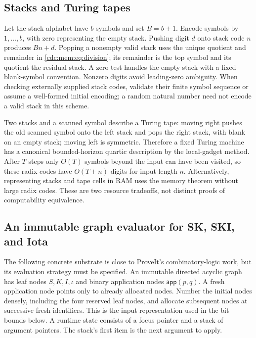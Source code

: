 \documentclass[11pt,a4paper]{article}
\theoremstyle{definition}
\theoremstyle{remark}
\newcommand{\app}{\mathsf{app}}
\begin{document}
\subsection{Stacks and Turing tapes}
Let the stack alphabet have $b$ symbols and set $B=b+1$. Encode symbols by
$1,\ldots,b$, with zero representing the empty stack. Pushing digit $d$ onto
stack code $n$ produces $Bn+d$. Popping a nonempty valid stack uses the unique
quotient and remainder in \eqref{cdc:mem:eq:division}; its remainder is the top symbol
and its quotient the residual stack. A zero test handles the empty stack with
a fixed blank-symbol convention. Nonzero digits avoid leading-zero ambiguity.
When checking externally supplied stack codes, validate their finite symbol
sequence or assume a well-formed initial encoding; a random natural number need
not encode a valid stack in this scheme.

Two stacks and a scanned symbol describe a Turing tape: moving right pushes the
old scanned symbol onto the left stack and pops the right stack, with blank on
an empty stack; moving left is symmetric. Therefore a fixed Turing machine has
a canonical bounded-horizon quartic description by the local-gadget method.
After $T$ steps only $O(T)$ symbols beyond the input can have been visited, so
these radix codes have $O(T+n)$ digits for input length $n$. Alternatively,
representing stacks and tape cells in RAM uses the memory theorem without
large radix codes. These are two resource tradeoffs, not distinct proofs of
computability equivalence.

\subsection{An immutable graph evaluator for SK, SKI, and Iota}
\label{cdc:mem:subsec:graph}
The following concrete substrate is close to ProveIt's combinatory-logic work,
but its evaluation strategy must be specified. An immutable directed acyclic
graph has leaf nodes $S,K,I,\iota$ and binary application nodes
$\app(p,q)$. A fresh application node points only to already allocated nodes.
Number the initial nodes densely, including the four reserved leaf nodes,
and allocate subsequent nodes at successive fresh identifiers. This is the
input representation used in the bit bounds below. A runtime state
consists of a focus pointer and a stack of argument pointers. The stack's first
item is the next argument to apply.
\end{document}
